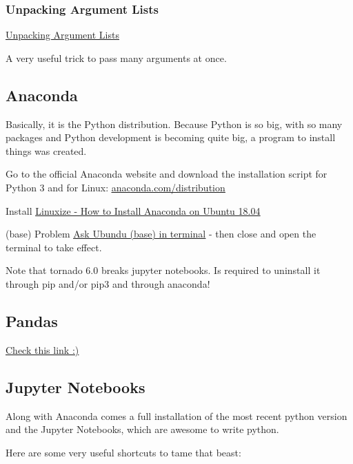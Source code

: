 \subsubsection{Unpacking Argument Lists}

\href{https://docs.python.org/3.7/tutorial/controlflow.html#unpacking-argument-lists}{\ul{Unpacking Argument Lists}}

A very useful trick to pass many arguments at once.




\subsection{Anaconda}
Basically, it is the Python distribution. Because Python is so big, with so many packages and Python development is becoming quite big, a program to install things was created.

Go to the official Anaconda website and download the installation script for Python 3 and for Linux: \href{https://www.anaconda.com/distribution/}{\ul{anaconda.com/distribution}}


Install \href{https://linuxize.com/post/how-to-install-anaconda-on-ubuntu-18-04/}{\ul{Linuxize - How to Install Anaconda on Ubuntu 18.04}}

(base) Problem \href{https://askubuntu.com/questions/1026383/why-does-base-appear-in-front-of-my-terminal-prompt}{\ul{Ask Ubundu (base) in terminal}} - then close and open the terminal to take effect.


Note that tornado 6.0 breaks jupyter notebooks. Is required to uninstall it through pip and/or pip3 and through anaconda!


\subsection{Pandas}
\href{https://towardsdatascience.com/pandas-tips-and-tricks-33bcc8a40bb9?gi=29663f5b3e5
}{\ul{Check this link :)}}




\subsection{Jupyter Notebooks}
\par Along with Anaconda comes a full installation of the most recent python version and the Jupyter Notebooks, which are awesome to write python.
\par Here are some very useful shortcuts to tame that beast:
\vspace{.5cm}

